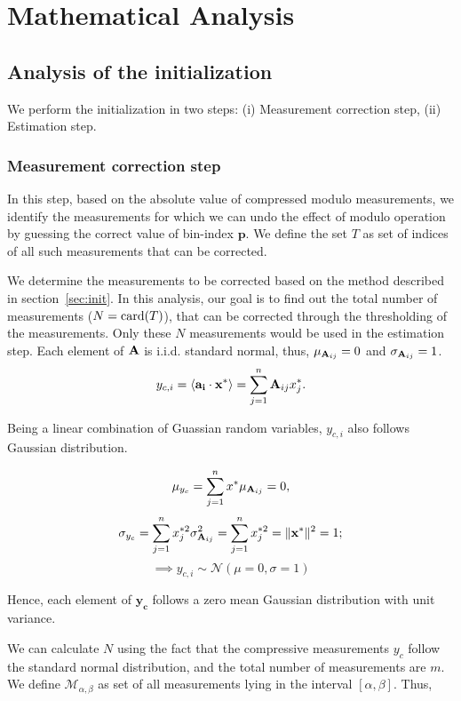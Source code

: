 \section{Mathematical Analysis}
\label{sec:mathanalysis}
\subsection{Analysis of the initialization}
We perform the initialization in two steps:
(i) Measurement correction step, (ii) Estimation step.

\subsubsection{Measurement correction step}\label{meascorr}In this step, based on the absolute value of compressed modulo measurements, we identify the measurements for which we can undo the effect of modulo operation by guessing the correct value of bin-index $\mathbf{p}$. We define the set $T$ as set of indices of all such measurements that can be corrected.

We determine the measurements to be corrected based on the method described in section~\ref{sec:init}. 
In this analysis, our goal is to find out the total number of measurements ($N=\mathrm{card}(T)$), that can be corrected through the thresholding of the measurements. Only these $N$ measurements would be used in the estimation step.
Each element of $\mathbf{A}$ is i.i.d. standard normal, thus, $\mu_{\mathbf{A}_{ij}} = 0$ and $\sigma_{\mathbf{A}_{ij}}=1$.
$$
y_{c,i} =\langle \mathbf{a_i} \cdot \mathbf{x^*} \rangle = \sum_{j=1}^{n}\mathbf{A}_{ij}x^*_{j}.
$$

Being a linear combination of Guassian random variables, $y_{c,i}$ also follows Gaussian distribution.

$$
\mu_{y_{c}} = \sum_{j=1}^{n}x^{*}\mu_{\mathbf{A}_{ij}} = 0,
$$
$$
\sigma_{y_{c}} =\sum_{j=1}^{n}x^{*2}_{j} \sigma^2_{\mathbf{A}_{ij}} = \sum_{j=1}^{n}x^{*2}_{j} = \|\mathbf{{x}^*}\|^2 = 1;
$$
$$
\implies y_{c,i} \sim \mathcal{N}\left(\mu= 0, \sigma = 1 \right)
$$

Hence, each element of $\mathbf{y_c}$ follows a zero mean Gaussian distribution with unit variance.

We can calculate $N$ using the fact that the compressive measurements $y_c$ follow the standard normal distribution, and the total number of measurements are $m$. We define $\mathcal{M}_{\alpha,\beta}$ as set of all measurements lying in the interval $[\alpha,\beta]$. Thus,

